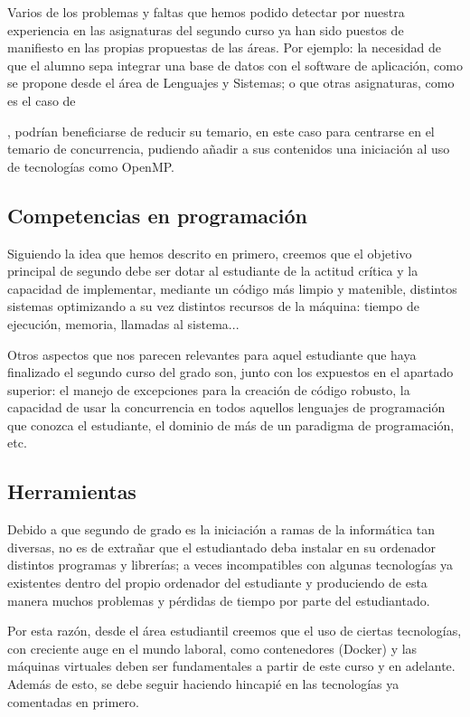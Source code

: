 Varios de los problemas y faltas que hemos podido detectar
por nuestra experiencia en las asignaturas del segundo curso
ya han sido puestos de manifiesto en las propias propuestas de las áreas.
Por ejemplo: la necesidad de que el alumno sepa integrar una base de datos
con el software de aplicación,
como se propone desde el área de Lenguajes y Sistemas;
o que otras asignaturas,
como es el caso de \subject{Programación Concurrente y Distribuida},
podrían beneficiarse de reducir su temario,
en este caso para centrarse en el temario de concurrencia,
pudiendo añadir a sus contenidos
una iniciación al uso de tecnologías como OpenMP.

\subsection{Competencias en programación}

Siguiendo la idea que hemos descrito en primero,
creemos que el objetivo principal de segundo debe ser
dotar al estudiante de la actitud crítica y la capacidad de implementar,
mediante un código más limpio y matenible,
distintos sistemas optimizando a su vez distintos recursos de la máquina:
tiempo de ejecución, memoria, llamadas al sistema...

Otros aspectos que nos parecen relevantes
para aquel estudiante que haya finalizado el segundo curso del grado son,
junto con los expuestos en  el apartado superior:
el manejo de excepciones para la creación de código robusto,
la capacidad de usar la concurrencia
en todos aquellos lenguajes de programación que conozca el estudiante,
el dominio de más de un paradigma de programación, etc.

\subsection{Herramientas}

Debido a que segundo de grado es la iniciación a
ramas de la informática tan diversas,
no es de extrañar que el estudiantado deba
instalar en su ordenador distintos programas y librerías;
a veces incompatibles con algunas tecnologías
ya existentes dentro del propio ordenador del estudiante y
produciendo de esta manera muchos problemas y
pérdidas de tiempo por parte del estudiantado.

Por esta razón, desde el área estudiantil creemos que
el uso de ciertas tecnologías, con creciente auge en el mundo laboral,
como contenedores (Docker) y
las máquinas virtuales deben ser fundamentales
a partir de este curso y en adelante.
Además de esto, se debe seguir haciendo hincapié en
las tecnologías ya comentadas en primero.

